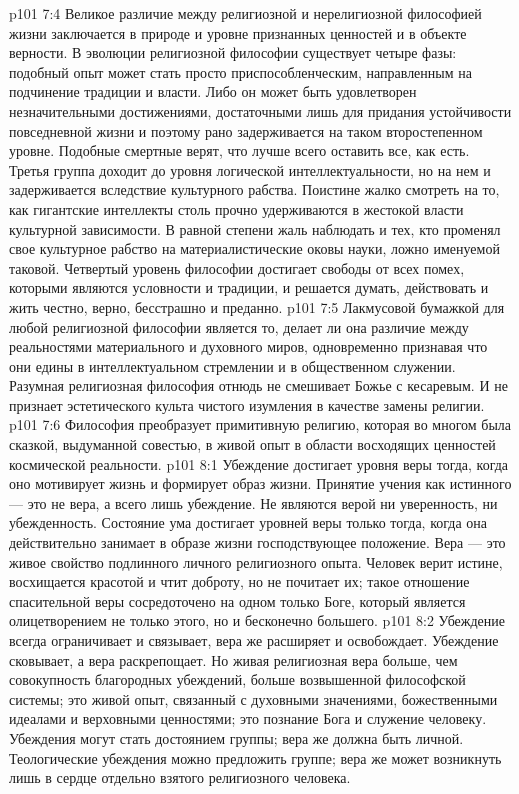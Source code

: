 \vs p101 7:4 \pc Великое различие между религиозной и нерелигиозной философией жизни заключается в природе и уровне признанных ценностей и в объекте верности. В эволюции религиозной философии существует четыре фазы: подобный опыт может стать просто приспособленческим, направленным на подчинение традиции и власти. Либо он может быть удовлетворен незначительными достижениями, достаточными лишь для придания устойчивости повседневной жизни и поэтому рано задерживается на таком второстепенном уровне. Подобные смертные верят, что лучше всего оставить все, как есть. Третья группа доходит до уровня логической интеллектуальности, но на нем и задерживается вследствие культурного рабства. Поистине жалко смотреть на то, как гигантские интеллекты столь прочно удерживаются в жестокой власти культурной зависимости. В равной степени жаль наблюдать и тех, кто променял свое культурное рабство на материалистические оковы науки, ложно именуемой таковой. Четвертый уровень философии достигает свободы от всех помех, которыми являются условности и традиции, и решается думать, действовать и жить честно, верно, бесстрашно и преданно.
\vs p101 7:5 Лакмусовой бумажкой для любой религиозной философии является то, делает ли она различие между реальностями материального и духовного миров, одновременно признавая что они едины в интеллектуальном стремлении и в общественном служении. Разумная религиозная философия отнюдь не смешивает Божье с кесаревым. И не признает эстетического культа чистого изумления в качестве замены религии.
\vs p101 7:6 Философия преобразует примитивную религию, которая во многом была сказкой, выдуманной совестью, в живой опыт в области восходящих ценностей космической реальности.
\vs p101 8:1 Убеждение достигает уровня веры тогда, когда оно мотивирует жизнь и формирует образ жизни. Принятие учения как истинного --- это не вера, а всего лишь убеждение. Не являются верой ни уверенность, ни убежденность. Состояние ума достигает уровней веры только тогда, когда она действительно занимает в образе жизни господствующее положение. Вера --- это живое свойство подлинного личного религиозного опыта. Человек верит истине, восхищается красотой и чтит доброту, но не почитает их; такое отношение спасительной веры сосредоточено на одном только Боге, который является олицетворением не только этого, но и бесконечно большего.
\vs p101 8:2 Убеждение всегда ограничивает и связывает, вера же расширяет и освобождает. Убеждение сковывает, а вера раскрепощает. Но живая религиозная вера больше, чем совокупность благородных убеждений, больше возвышенной философской системы; это живой опыт, связанный с духовными значениями, божественными идеалами и верховными ценностями; это познание Бога и служение человеку. Убеждения могут стать достоянием группы; вера же должна быть личной. Теологические убеждения можно предложить группе; вера же может возникнуть лишь в сердце отдельно взятого религиозного человека.

